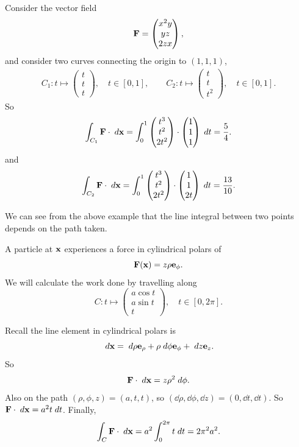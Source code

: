 \documentclass[a4paper]{scrartcl}
\begin{document}
\begin{example}
	\label{ex:q}
	Consider the vector field 
	$$
	\mathbf{F} = \begin{pmatrix}
		x^2 y \\ yz \\ 2zx
	\end{pmatrix},
	$$
	and consider two curves connecting the origin to $(1, 1, 1)$,
	\begin{align*}
		C_1: t \longmapsto \begin{pmatrix}
			t \\ t\\ t
		\end{pmatrix}, \quad t \in [0, 1], \quad \quad
		C_2: t \longmapsto \begin{pmatrix}
			t \\ t\\ t^2
		\end{pmatrix}, \quad t \in [0, 1].
	\end{align*}
	So
	$$
	\int_{C_1} \mathbf{F} \cdot \; d \mathbf{x}= \int_0^1 \begin{pmatrix}
		t^3 \\ t^2\\ 2t^2
	\end{pmatrix} \cdot \begin{pmatrix}
		1 \\ 1\\ 1
	\end{pmatrix} \; d t = \frac{5}{4}.
	$$
	and
	$$
	\int_{C_2} \mathbf{F} \cdot \; d \mathbf{x}= \int_0^1 \begin{pmatrix}
		t^3 \\ t^2\\ 2t^2
	\end{pmatrix} \cdot \begin{pmatrix}
		1 \\ 1\\ 2t
	\end{pmatrix} \; d t = \frac{13}{10}.
	$$
\end{example}

We can see from the above example that the line integral between two points depends on the path taken.

\begin{example}
	A particle at $\mathbf{x}$ experiences a force in cylindrical polars of
	$$
	\mathbf{F}(\mathbf{x}) = z \rho \mathbf{e}_{\phi}.
	$$
	We will calculate the work done by travelling along
	$$
	C: t \longmapsto \begin{pmatrix}
		a \cos t \\ a \sin t \\ t
	\end{pmatrix}, \quad t \in [0, 2\pi].
	$$

	Recall the line element in cylindrical polars is
	$$
	\; d \mathbf{x} = \; d \rho \mathbf{e}_{\rho} + \rho \; d \phi \mathbf{e}_{\phi} + \; d z \mathbf{e}_z.
	$$
	So
	$$
\mathbf{F} \cdot \; d \mathbf{x} = z \rho^2 \; d \phi.
	$$
	Also on the path $(\rho, \phi, z) = (a, t, t)$, so $(\dd \rho, \dd \phi, \dd z) = (0, \dd t, \dd t)$. So $\mathbf{F} \cdot \; d \mathbf{x} = a^2 t \; d t$. Finally,
	$$
	\int_C \mathbf{F} \cdot \; d \mathbf{x} = a^2 \int_0^{2 \pi} t \; d t = 2 \pi^2 a^2.
	$$
\end{example}
\end{document}
